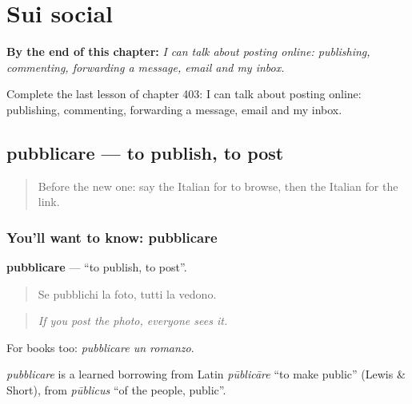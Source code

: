 
\chapter{Sui social}
\label{ch:it-sui-social}

\begin{chapteropening}
\textbf{By the end of this chapter:} \emph{I can talk about posting online: publishing, commenting, forwarding a message, email and my inbox.}

Complete the last lesson of chapter 403: I can talk about posting online: publishing, commenting, forwarding a message, email and my inbox.
\end{chapteropening}

\section[pubblicare]{pubblicare — to publish, to post}

\label{lesson:IT-C403-pubblicare}



\begin{quote}
Before the new one: say the Italian for to browse, then the Italian for the link.
\end{quote}

\subsection*{You'll want to know: pubblicare}
\textbf{pubblicare} — \textquotedblleft{}to publish, to post\textquotedblright{}.

\begin{quote}
Se pubblichi la foto, tutti la vedono.
\end{quote}

\begin{quote}
\emph{If you post the photo, everyone sees it.}
\end{quote}

For books too: \emph{pubblicare un romanzo}.

\begin{cousinweb}
\emph{pubblicare} is a learned borrowing from Latin \emph{pūblicāre} \textquotedblleft{}to make public\textquotedblright{} (Lewis \& Short), from \emph{pūblicus} \textquotedblleft{}of the people, public\textquotedblright{}.
\end{cousinweb}

